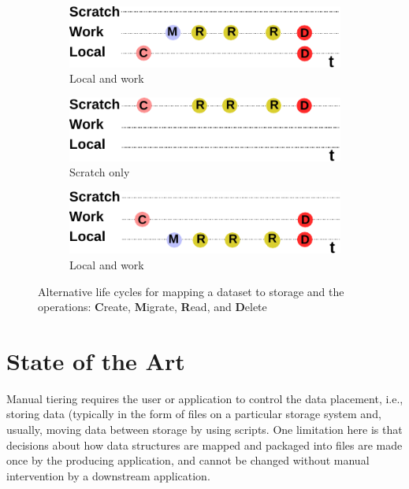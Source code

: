 \documentclass[a4paper]{article}
\begin{document}
\begin{figure}[H]
  \centering
  \begin{subfigure}{.45\textwidth}
  \includegraphics[width=0.9\columnwidth]{lifecycle-1}
  \caption{Local and work}
  \end{subfigure}
  \begin{subfigure}{.45\textwidth}
  \includegraphics[width=0.9\columnwidth]{lifecycle-2}
  \caption{Scratch only}
  \end{subfigure}

  \begin{subfigure}{.45\textwidth}
  \includegraphics[width=0.9\columnwidth]{lifecycle-3}
  \caption{Local and work}
  \end{subfigure}

  \caption{Alternative life cycles for mapping a dataset to storage and the operations: \textbf{C}reate, \textbf{M}igrate, \textbf{R}ead, and \textbf{D}elete}
  \label{fig:lifecycle}
\end{figure}


\section{State of the Art}

Manual tiering requires the user or application to control the data placement, i.e., storing data (typically in the form of files on a particular storage system and, usually, moving data between storage by using scripts.
One limitation here is that decisions about how data structures are mapped and packaged into files are made once by the producing application, and cannot be changed without manual intervention by a downstream application.
\end{document}

